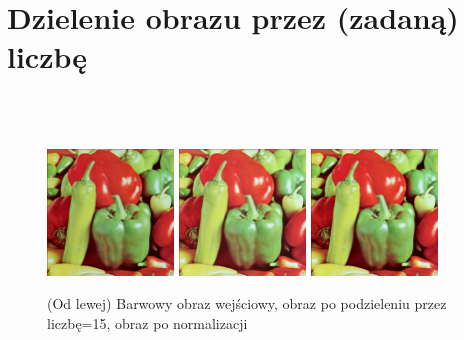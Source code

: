 \documentclass[final,a4paper,openany,12pt]{mwbk}
\begin{document}
\section{ Dzielenie obrazu przez (zadaną) liczbę}

\hfill
\\\\
\indent

\begin{figure}[H]
	\begin{center}
		\includegraphics[width=0.3\textwidth]{1/1Color_Div_Original}
		\includegraphics[width=0.3\textwidth]{1/1Color_Div_Result}
		\includegraphics[width=0.3\textwidth]{1/1Color_Div_Result_Norm}
	\end{center}
	\caption{(Od lewej) Barwowy obraz wejściowy, obraz po podzieleniu przez liczbę=15, obraz po normalizacji }
\end{figure}
\end{document}
